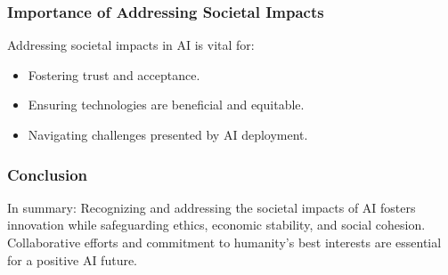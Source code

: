 \documentclass[aspectratio=169]{beamer}
\begin{document}
\begin{frame}[fragile]
    \frametitle{Importance of Addressing Societal Impacts}
    
    Addressing societal impacts in AI is vital for:
    \begin{itemize}
        \item Fostering trust and acceptance.
        \item Ensuring technologies are beneficial and equitable.
        \item Navigating challenges presented by AI deployment.
    \end{itemize}
\end{frame}

\begin{frame}[fragile]
    \frametitle{Conclusion}
    
    In summary:
    Recognizing and addressing the societal impacts of AI fosters innovation while safeguarding ethics, economic stability, and social cohesion.
    Collaborative efforts and commitment to humanity's best interests are essential for a positive AI future.
\end{frame}
\end{document}
